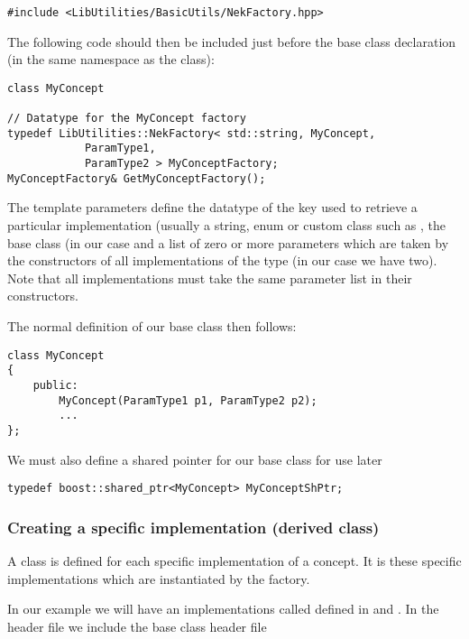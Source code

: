\begin{lstlisting}[style=C++Style]
#include <LibUtilities/BasicUtils/NekFactory.hpp>
\end{lstlisting}

The following code should then be included just before the base class
declaration (in the same namespace as the class):

\begin{lstlisting}[style=C++Style]
class MyConcept

// Datatype for the MyConcept factory
typedef LibUtilities::NekFactory< std::string, MyConcept, 
            ParamType1,
            ParamType2 > MyConceptFactory;
MyConceptFactory& GetMyConceptFactory();
\end{lstlisting}

The template parameters define the datatype of the key used to retrieve a
particular implementation (usually a string, enum or custom class such as
, the base class (in our case  and a list
of zero or more parameters which are taken by the constructors of all
implementations of the type  (in our case we have two). Note
that all implementations must take the same parameter list in their constructors.

The normal definition of our base class then follows:

\begin{lstlisting}[style=C++Style]
class MyConcept 
{
    public:
        MyConcept(ParamType1 p1, ParamType2 p2);
        ...
};
\end{lstlisting}

We must also define a shared pointer for our base class for use later
\begin{lstlisting}[style=C++Style]
typedef boost::shared_ptr<MyConcept> MyConceptShPtr;
\end{lstlisting}

\subsubsection{Creating a specific implementation (derived class)}
A class is defined for each specific implementation of a concept. It is these
specific implementations which are instantiated by the factory.

In our example we will have an implementations called 
defined in  and . In the
header file we include the base class header file

